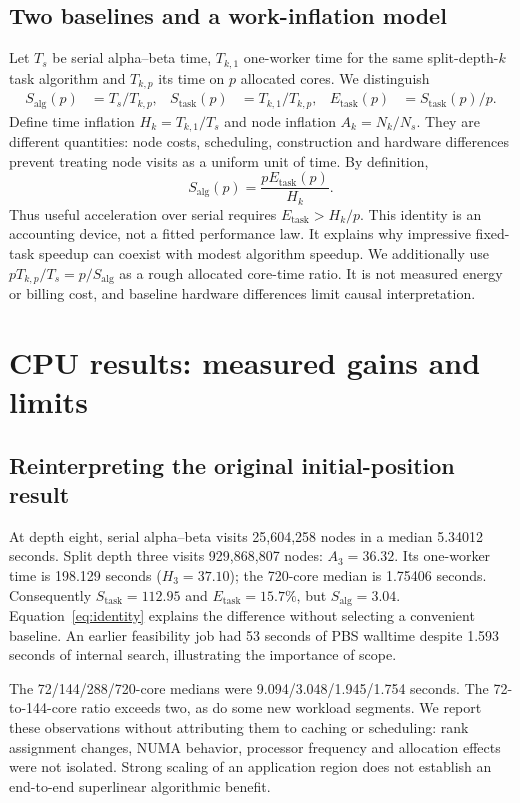 \documentclass[11pt,a4paper]{article}
\begin{document}
\subsection{Two baselines and a work-inflation model}
Let $T_s$ be serial alpha--beta time, $T_{k,1}$ one-worker time for the same
split-depth-$k$ task algorithm and $T_{k,p}$ its time on $p$ allocated cores.
We distinguish
\begin{align}
 S_{\mathrm{alg}}(p)&=T_s/T_{k,p},&
 S_{\mathrm{task}}(p)&=T_{k,1}/T_{k,p},&
 E_{\mathrm{task}}(p)&=S_{\mathrm{task}}(p)/p.\label{eq:metrics}
\end{align}
Define time inflation $H_k=T_{k,1}/T_s$ and node inflation
$A_k=N_{k}/N_s$. They are different quantities: node costs, scheduling,
construction and hardware differences prevent treating node visits as a uniform
unit of time. By definition,
\begin{equation}
 \boxed{S_{\mathrm{alg}}(p)=\frac{pE_{\mathrm{task}}(p)}{H_k}}.
 \label{eq:identity}
\end{equation}
Thus useful acceleration over serial requires $E_{\mathrm{task}}>H_k/p$.
This identity is an accounting device, not a fitted performance law. It explains
why impressive fixed-task speedup can coexist with modest algorithm speedup.
We additionally use $pT_{k,p}/T_s=p/S_{\mathrm{alg}}$ as a rough allocated
core-time ratio. It is not measured energy or billing cost, and baseline
hardware differences limit causal interpretation.

\section{CPU results: measured gains and limits}
\subsection{Reinterpreting the original initial-position result}
At depth eight, serial alpha--beta visits 25,604,258 nodes in a median
5.34012 seconds. Split depth three visits 929,868,807 nodes: $A_3=36.32$.
Its one-worker time is 198.129 seconds ($H_3=37.10$); the 720-core median is
1.75406 seconds. Consequently $S_{\mathrm{task}}=112.95$ and
$E_{\mathrm{task}}=15.7\%$, but $S_{\mathrm{alg}}=3.04$.
Equation~\ref{eq:identity} explains the difference without selecting a convenient
baseline. An earlier feasibility job had 53 seconds of PBS walltime despite
1.593 seconds of internal search, illustrating the importance of scope.

The 72/144/288/720-core medians were 9.094/3.048/1.945/1.754 seconds. The
72-to-144-core ratio exceeds two, as do some new workload segments. We report
these observations without attributing them to caching or scheduling: rank
assignment changes, NUMA behavior, processor frequency and allocation effects
were not isolated. Strong scaling of an application region does not establish
an end-to-end superlinear algorithmic benefit.
\end{document}
